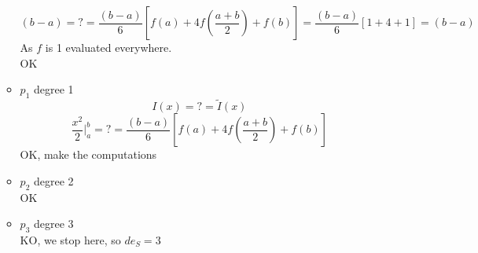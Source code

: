\begin{itemize}
\begin{itemize}
$$        (b-a)=?=
        \frac{(b-a)}{6}\left[
            f(a)+
            4f\left(\frac{a+b}{2}\right)+f(b)
        \right]=
        \frac{(b-a)}{6}\left[
            1+
            4+1
        \right]
        =(b-a)
        $$
        As $f$ is 1 evaluated everywhere.\\
        OK
        \item $p_1$ degree 1
        $$I(x)=?=\tilde{I}(x)$$
        $$
        \frac{x^2}{2}\Big|_a^b=?=
        \frac{(b-a)}{6}\left[
            f(a)+
            4f\left(\frac{a+b}{2}\right)+f(b)
        \right]
        $$
        OK, make the computations
        \item $p_2$ degree 2\\
        OK
        \item $p_3$ degree 3\\
        KO, we stop here, so $de_{S}=3$
    \end{itemize}
\end{itemize}

